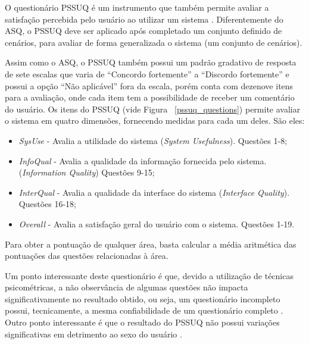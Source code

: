       O questionário PSSUQ é um instrumento que também permite avaliar a satisfação percebida pelo usuário ao utilizar um
      sistema \cite{lewis02}. Diferentemente do ASQ, o PSSUQ deve ser aplicado após completado um conjunto definido de cenários,
      para avaliar de forma generalizada o sistema (um conjunto de cenários).
      
      Assim como o ASQ, o PSSUQ também possui um padrão gradativo de resposta de sete escalas que varia de “Concordo fortemente”
      a “Discordo fortemente” e possui a opção “Não aplicável” fora da escala, porém conta com dezenove itens para a avaliação,
      onde cada item tem a possibilidade de receber um comentário do usuário. Os itens do PSSUQ (vide Figura ~\ref{pssuq_questions})
      permite avaliar o sistema em quatro dimensões, fornecendo medidas para cada um deles. São eles:
      
      \begin{itemize}
       \item \textit{SysUse} - Avalia a utilidade do sistema (\textit{System Usefulness}).
	  \subitem Questões 1-8;
      
       \item \textit{InfoQual} - Avalia a qualidade da informação fornecida pelo sistema. (\textit{Information Quality})
	  \subitem Questões 9-15;
	  
       \item \textit{InterQual} - Avalia a qualidade da interface do sistema (\textit{Interface Quality}).
	  \subitem Questões 16-18;
       
       \item \textit{Overall} - Avalia a satisfação geral do usuário com o sistema.
	  \subitem Questões 1-19.

      \end{itemize}
      
      Para obter a pontuação de qualquer área, basta calcular a média aritmética das pontuações das questões relacionadas à área.
      
      
      Um ponto interessante deste questionário é que, devido a utilização de técnicas psicométricas, a não observância de
      algumas questões não impacta significativamente no resultado obtido, ou seja, um questionário incompleto possui, 
      tecnicamente, a mesma confiabilidade de um questionário completo \cite{lewis02}. Outro ponto interessante é que o
      resultado do PSSUQ não possui variações significativas em detrimento ao sexo do usuário \cite{lewis02}.
      

